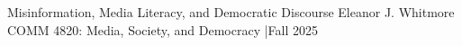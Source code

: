 \documentclass[11pt, letterpaper]{article}
\begin{document}
\color{neutral}

\titleblock
  {Misinformation, Media Literacy, and Democratic Discourse}
  {Eleanor J. Whitmore}
  {COMM 4820: Media, Society, and Democracy \quad|\quad Fall 2025}





\end{document}

